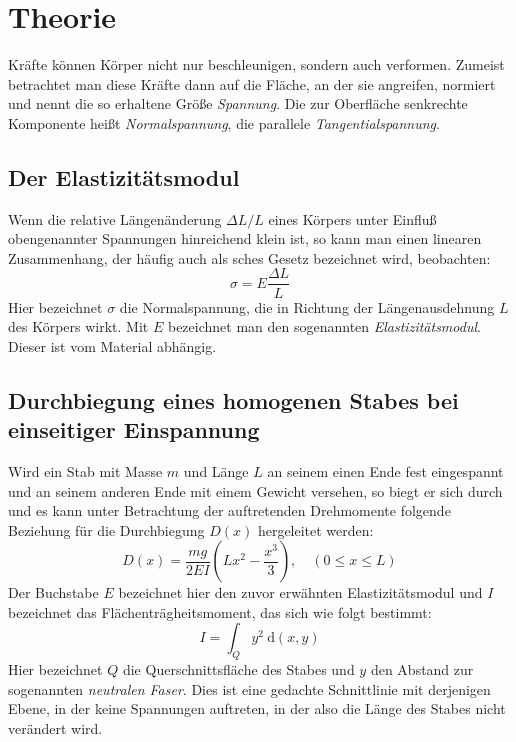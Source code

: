 
\section{Theorie}

Kräfte können Körper nicht nur beschleunigen, sondern auch
verformen. Zumeist betrachtet man diese Kräfte dann auf die Fläche, an
der sie angreifen, normiert und nennt die so erhaltene Größe
\emph{Spannung}. Die zur Oberfläche senkrechte Komponente heißt
\emph{Normalspannung}, die parallele \emph{Tangentialspannung}.

\subsection{Der Elastizitätsmodul}

Wenn die relative Längenänderung $\Delta L/L$ eines Körpers unter
Einfluß obengenannter Spannungen hinreichend klein ist, so kann man
einen linearen Zusammenhang, der häufig auch als sches Gesetz
bezeichnet wird, beobachten:
%
\begin{equation}
  \label{eq:hook's-law}
  \sigma = E\frac{\Delta L}{L}
\end{equation}
%
Hier bezeichnet $\sigma$ die Normalspannung, die in Richtung der
Längenausdehnung $L$ des Körpers wirkt. Mit $E$ bezeichnet man den
sogenannten \emph{Elastizitätsmodul}. Dieser ist vom Material abhängig.

\subsection{Durchbiegung eines homogenen Stabes bei einseitiger
  Einspannung}

Wird ein Stab mit Masse $m$ und Länge $L$ an seinem einen Ende fest
eingespannt und an seinem anderen Ende mit einem Gewicht versehen, so
biegt er sich durch und es kann unter Betrachtung der auftretenden
Drehmomente folgende Beziehung für die Durchbiegung $D(x)$ hergeleitet
werden:
%
\begin{equation}
  \label{eq:durchbiegung-einseitig}
  D(x) = \frac{mg}{2EI}\left(Lx^2 - \frac{x^3}{3}\right), \quad (0\le
  x\le L)
\end{equation}
%
Der Buchstabe $E$ bezeichnet hier den zuvor erwähnten Elastizitätsmodul
und $I$ bezeichnet das Flächenträgheitsmoment, das sich wie folgt
bestimmt:
%
\begin{equation}
  \label{eq:flaechentraeg.moment}
  I = \int_Q y^2\:\mathrm{d}(x, y)
\end{equation}
%
Hier bezeichnet $Q$ die Querschnittsfläche des Stabes und $y$ den
Abstand zur sogenannten \emph{neutralen Faser}. Dies ist eine gedachte
Schnittlinie mit derjenigen Ebene, in der keine Spannungen auftreten,
in der also die Länge des Stabes nicht verändert wird.

